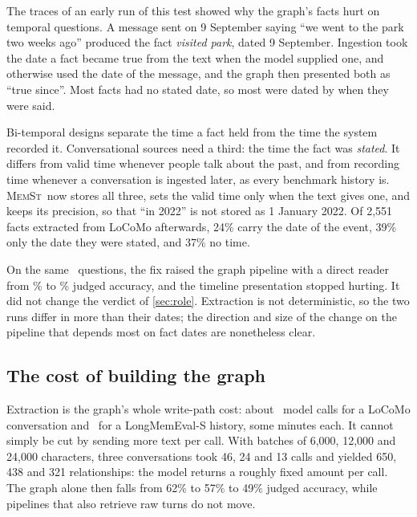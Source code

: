\documentclass[11pt,letterpaper]{article}
\newcommand{\memst}{\textsc{MemSt}}
\begin{document}
The traces of an early run of this test showed why the graph's facts hurt on temporal questions. A message sent on 9 September saying ``we went to the park two weeks ago'' produced the fact \emph{visited park}, dated 9 September. Ingestion took the date a fact became true from the text when the model supplied one, and otherwise used the date of the message, and the graph then presented both as ``true since''. Most facts had no stated date, so most were dated by when they were said.

Bi-temporal designs separate the time a fact held from the time the system recorded it. Conversational sources need a third: the time the fact was \emph{stated}. It differs from valid time whenever people talk about the past, and from recording time whenever a conversation is ingested later, as every benchmark history is. \memst\ now stores all three, sets the valid time only when the text gives one, and keeps its precision, so that ``in 2022'' is not stored as 1 January 2022. Of 2,551 facts extracted from LoCoMo afterwards, 24\% carry the date of the event, 39\% only the date they were stated, and 37\% no time.

On the same \numRoleQuestions\ questions, the fix raised the graph pipeline with a direct reader from \numRoleDefaultDirectOld\% to \numRoleDefaultDirectNew\% judged accuracy, and the timeline presentation stopped hurting. It did not change the verdict of \cref{sec:role}. Extraction is not deterministic, so the two runs differ in more than their dates; the direction and size of the change on the pipeline that depends most on fact dates are nonetheless clear.

\subsection{The cost of building the graph}

Extraction is the graph's whole write-path cost: about \numLocomoGraphCalls\ model calls for a LoCoMo conversation and \numLmeGraphCalls\ for a LongMemEval-S history, some minutes each. It cannot simply be cut by sending more text per call. With batches of 6,000, 12,000 and 24,000 characters, three conversations took 46, 24 and 13 calls and yielded 650, 438 and 321 relationships: the model returns a roughly fixed amount per call. The graph alone then falls from 62\% to 57\% to 49\% judged accuracy, while pipelines that also retrieve raw turns do not move.

\end{document}
